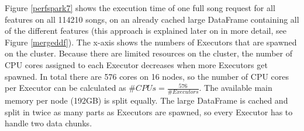\noindent Figure \ref{perfspark7} shows the execution time of one full song request for all features on all 114210 songs, on an already cached large DataFrame containing all of the different features (this approach is explained later on in more detail, see Figure \ref{mergeddf}).
The x-axis shows the numbers of Executors that are spawned on the cluster. Because there are limited resources on the cluster, the number of CPU cores assigned to each Executor decreases when more Executors get spawned. In total there are 576 cores on 16 nodes, so the number of CPU cores per Executor can be calculated as $\#CPUs = \frac{576}{\#Executors}$. The available main memory per node (192GB) is split equally. The large DataFrame is cached and split in twice as many parts as Executors are spawned, so every Executor has to handle two data chunks.


